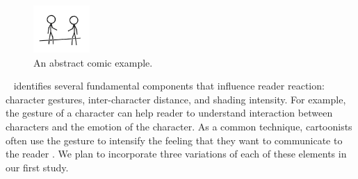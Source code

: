 

\begin{figure}
	\centering
	\includegraphics[width=0.19\textwidth]{figures/xkcd_example}
	\vspace{-10pt}
    \caption{An abstract comic example.}
    \label{fig:xkcd}
	\vspace{-10pt}
\end{figure}

~\textcite{scott1993understanding} identifies several fundamental components that influence reader reaction: character gestures, inter-character distance, and shading intensity. For example, the gesture of a character can help reader to understand interaction between characters and the emotion of the character. As a common technique, cartoonists often use the gesture to intensify the feeling that they want to communicate to the reader \cite{scott1993understanding}.
We plan to incorporate three variations of each of these elements in our first study.



